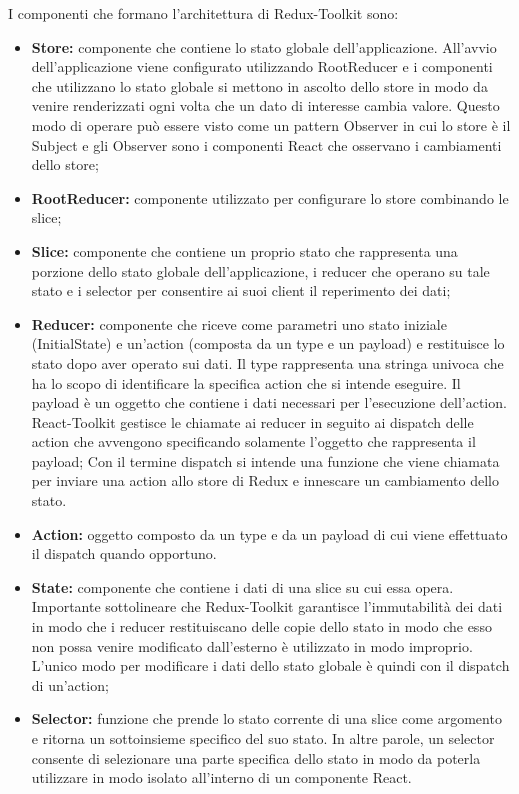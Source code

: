 I componenti che formano l'architettura di Redux-Toolkit sono:
\begin{itemize}
    \item \textbf{Store:} componente che contiene lo stato globale dell'applicazione.
          All'avvio dell'applicazione viene configurato utilizzando RootReducer e i componenti che utilizzano
          lo stato globale si mettono in ascolto dello store in modo da venire renderizzati ogni volta che un dato
          di interesse cambia valore. Questo modo di operare può essere visto come un pattern Observer in
          cui lo store è il Subject e gli Observer sono i componenti React che osservano i cambiamenti dello store;
    \item \textbf{RootReducer:} componente utilizzato per configurare lo store combinando le slice;
    \item \textbf{Slice:} componente che contiene un proprio stato che rappresenta una porzione dello stato globale
          dell'applicazione, i reducer che operano su tale stato e i selector per consentire ai suoi client il
          reperimento dei dati;
    \item \textbf{Reducer:} componente che riceve come parametri uno stato iniziale (InitialState) e un'action
          (composta da un type e un payload) e restituisce lo stato dopo aver operato sui dati.
          Il type rappresenta una stringa univoca che ha lo scopo di identificare la specifica action che si intende eseguire.
          Il payload è un oggetto che contiene i dati necessari per l'esecuzione dell'action.
          React-Toolkit gestisce le chiamate ai reducer in seguito ai dispatch delle action che avvengono
          specificando solamente l'oggetto che rappresenta il payload;
          Con il termine dispatch si intende una funzione che viene chiamata per inviare una action allo store di Redux e innescare un cambiamento dello stato.
    \item \textbf{Action:} oggetto composto da un type e da un payload di cui viene effettuato il dispatch quando
          opportuno.
    \item \textbf{State:} componente che contiene i dati di una slice su cui essa opera.
          Importante sottolineare che Redux-Toolkit garantisce l'immutabilità dei dati in modo che i reducer restituiscano delle copie dello stato in modo che esso non possa venire
          modificato dall'esterno è utilizzato in modo improprio.
          L'unico modo per modificare i dati dello stato globale è quindi con il dispatch di un'action;
    \item \textbf{Selector:} funzione che prende lo stato corrente di una slice come argomento e ritorna un sottoinsieme
          specifico del suo stato. In altre parole, un selector consente di selezionare una parte specifica
          dello stato in modo da poterla utilizzare in modo isolato all'interno di un componente React.
\end{itemize}

